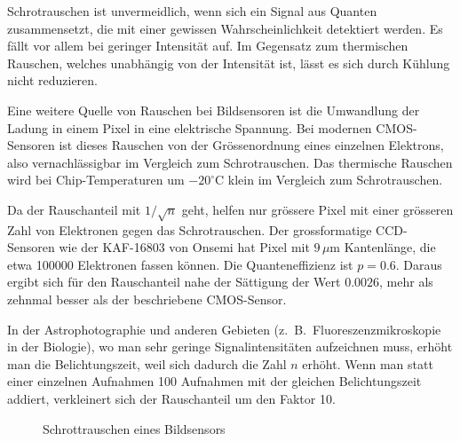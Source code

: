 \begin{diskussion}
Schrotrauschen ist unvermeidlich, wenn sich ein Signal aus Quanten
zusammensetzt, die mit einer gewissen Wahrscheinlichkeit detektiert werden.
Es fällt vor allem bei geringer Intensität auf.
Im Gegensatz zum thermischen Rauschen, welches unabhängig von der
Intensität ist, lässt es sich durch Kühlung nicht reduzieren.

Eine weitere Quelle von Rauschen bei Bildsensoren ist die Umwandlung
der Ladung in einem Pixel in eine elektrische Spannung. 
Bei modernen CMOS-Sensoren ist dieses Rauschen von der Grössenordnung
eines einzelnen Elektrons, also vernachlässigbar im Vergleich zum
Schrotrauschen.
Das thermische Rauschen wird bei Chip-Temperaturen um $-20^\circ\text{C}$
klein im Vergleich zum Schrotrauschen.

Da der Rauschanteil mit $1/\sqrt{n}$ geht, helfen nur grössere Pixel mit
einer grösseren Zahl von Elektronen gegen das Schrotrauschen.
Der grossformatige CCD-Sensoren wie der KAF-16803 von Onsemi hat
Pixel mit $9\,\mu\text{m}$ Kantenlänge, die etwa 100000 Elektronen
fassen können. 
Die Quanteneffizienz ist $p=0.6$.
Daraus ergibt sich für den Rauschanteil nahe der Sättigung der
Wert $0.0026$, mehr als zehnmal besser als der beschriebene
CMOS-Sensor.

In der Astrophotographie und anderen Gebieten (z.~B.~Fluoreszenzmikroskopie
in der Biologie), wo man sehr geringe Signalintensitäten aufzeichnen muss,
erhöht man die Belichtungszeit, weil sich dadurch die Zahl $n$ erhöht. 
Wenn man statt einer einzelnen Aufnahmen 100 Aufnahmen mit der gleichen
Belichtungszeit addiert, verkleinert sich der Rauschanteil um den
Faktor 10.
\end{diskussion}

\begin{figure}[h]
\centering
{}
\caption{Schrottrauschen eines Bildsensors
\label{50000039:shotnoise}}
\end{figure}


